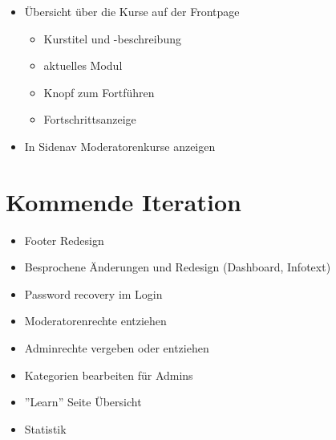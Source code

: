 \documentclass[colorback, accentcolor=tud1c, paper=a4]{tudexercise}
\begin{document}
\begin{multicols}{2}
\begin{itemize}
\begin{itemize}
\begin{itemize}
		\end{itemize}
		\item Übersicht über die Kurse auf der Frontpage
		\begin{itemize}
			\item Kurstitel und -beschreibung
			\item aktuelles Modul
			\item Knopf zum Fortführen
			\item Fortschrittsanzeige
		\end{itemize}
	\item In Sidenav Moderatorenkurse anzeigen
	\end{itemize}
\end{itemize}

\end{multicols}
\section*{Kommende Iteration}
\begin{multicols}{2}
\begin{itemize}
	\item Footer Redesign
	\item Besprochene Änderungen und Redesign (Dashboard, Infotext)
	\item Password recovery im Login
	\item Moderatorenrechte entziehen
	\item Adminrechte vergeben oder entziehen
	\item Kategorien bearbeiten für Admins
	\item ''Learn'' Seite Übersicht
	\item Statistik
\end{itemize}

\end{multicols}
\end{document}
